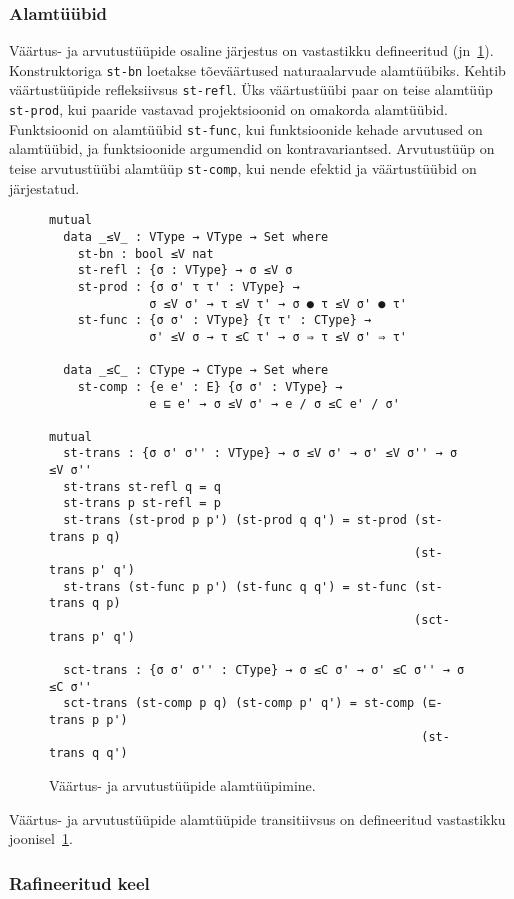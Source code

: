 \documentclass[a4paper,12pt]{article}
\begin{document}
\subsubsection{Alamtüübid}\label{ssec:exc.subtypes}
Väärtus- ja arvutustüüpide osaline järjestus on vastastikku defineeritud (jn~\ref{fig:exc.subtypes}).
Konstruktoriga {\tt st-bn} loetakse tõeväärtused naturaalarvude alamtüübiks.
Kehtib väärtustüüpide refleksiivsus {\tt st-refl}.
Üks väärtustüübi paar on teise alamtüüp {\tt st-prod}, kui paaride vastavad projektsioonid on omakorda alamtüübid.
Funktsioonid on alamtüübid {\tt st-func}, kui funktsioonide kehade arvutused on alamtüübid,
ja funktsioonide argumendid on kontravariantsed.
Arvutustüüp on teise arvutustüübi alamtüüp {\tt st-comp}, kui nende efektid ja väärtustüübid on järjestatud.
\begin{figure}
  \begin{BVerbatim}
mutual
  data _≤V_ : VType → VType → Set where
    st-bn : bool ≤V nat
    st-refl : {σ : VType} → σ ≤V σ
    st-prod : {σ σ' τ τ' : VType} →
              σ ≤V σ' → τ ≤V τ' → σ ● τ ≤V σ' ● τ'
    st-func : {σ σ' : VType} {τ τ' : CType} →
              σ' ≤V σ → τ ≤C τ' → σ ⇒ τ ≤V σ' ⇒ τ'

  data _≤C_ : CType → CType → Set where
    st-comp : {e e' : E} {σ σ' : VType} →
              e ⊑ e' → σ ≤V σ' → e / σ ≤C e' / σ'

mutual
  st-trans : {σ σ' σ'' : VType} → σ ≤V σ' → σ' ≤V σ'' → σ ≤V σ''
  st-trans st-refl q = q
  st-trans p st-refl = p
  st-trans (st-prod p p') (st-prod q q') = st-prod (st-trans p q)
                                                   (st-trans p' q')
  st-trans (st-func p p') (st-func q q') = st-func (st-trans q p)
                                                   (sct-trans p' q')

  sct-trans : {σ σ' σ'' : CType} → σ ≤C σ' → σ' ≤C σ'' → σ ≤C σ''
  sct-trans (st-comp p q) (st-comp p' q') = st-comp (⊑-trans p p')
                                                    (st-trans q q')
  \end{BVerbatim}
  \caption{Väärtus- ja arvutustüüpide alamtüüpimine.}
  \label{fig:exc.subtypes}
\end{figure}

Väärtus- ja arvutustüüpide alamtüüpide transitiivsus on defineeritud vastastikku joonisel~\ref{fig:exc.subtypes}.

\subsubsection{Rafineeritud keel}
\end{document}
